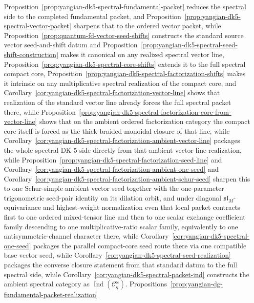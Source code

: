 \begin{remark}
\begin{itemize}
  Proposition~\ref{prop:yangian-dk5-spectral-fundamental-packet}
  reduces the spectral side to the completed fundamental packet, and
  Proposition~\ref{prop:yangian-dk5-spectral-vector-packet}
  sharpens that to the ordered vector packet, while
  Proposition~\ref{prop:quantum-fd-vector-seed-shifts} constructs the
  standard source vector seed-and-shift datum and
  Proposition~\ref{prop:yangian-dk5-spectral-seed-shift-construction}
  makes it canonical on any realized spectral vector line,
  Proposition~\ref{prop:yangian-dk5-spectral-core-shifts}
  extends it to the full spectral compact core,
  Proposition~\ref{prop:yangian-dk5-spectral-factorization-shifts}
  makes it intrinsic on any multiplicative spectral realization of the
  compact core, and
  Corollary~\ref{cor:yangian-dk5-spectral-factorization-vector-line}
  shows that realization of the standard vector line already forces
  the full spectral packet there,
  while
  Proposition~\ref{prop:yangian-dk5-spectral-factorization-core-from-vector-line}
  shows that on the ambient ordered factorization category the compact
  core itself is forced as the thick braided-monoidal closure of that
  line,
  while
  Corollary~\ref{cor:yangian-dk5-spectral-factorization-ambient-vector-line}
  packages the whole spectral DK-5 side directly from that ambient
  vector-line realization,
  while
  Proposition~\ref{prop:yangian-dk5-spectral-factorization-seed-line}
  and
  Corollary~\ref{cor:yangian-dk5-spectral-factorization-ambient-one-seed}
  and
  Corollary~\ref{cor:yangian-dk5-spectral-factorization-ambient-schur-seed}
  sharpen this to one Schur-simple ambient vector seed together with
  the one-parameter trigonometric seed-pair identity on its dilation
  orbit, and under diagonal \(\mathfrak{sl}_M\)-equivariance and
  highest-weight normalization even that local packet contracts first
  to one ordered mixed-tensor line and then to one scalar exchange
  coefficient family descending to one multiplicative-ratio scalar
  family, equivalently to one antisymmetric-channel character there,
  while Corollary~\ref{cor:yangian-dk5-spectral-one-seed}
  packages the parallel compact-core seed route there via one
  compatible base vector seed,
  while
  Corollary~\ref{cor:yangian-dk5-spectral-seed-realization}
  packages the converse closure statement from that standard datum to
  the full spectral side, while
  Corollary~\ref{cor:yangian-dk5-spectral-packet-ind} constructs the
  ambient spectral category as
  \(\operatorname{Ind}(\mathcal{C}_q^\omega)\).
  Propositions~\ref{prop:yangian-dg-fundamental-packet-realization}

\end{itemize}
\end{remark}
